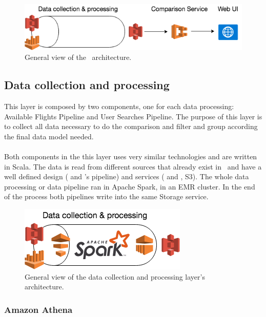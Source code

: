 \begin{figure}[H]
\centering
\includegraphics[scale=0.7]{diagrams/architecture01.png}
\caption{General view of the \thesis\ architecture.}
\end{figure}


\subsection{Data collection and processing} \label{data_layer}

This layer is composed by two components, one for each data processing: Available Flights Pipeline and User Searches Pipeline. The purpose of this layer is to collect all data necessary to do the comparison and filter and group according the final data model needed.
\\\\
Both components in the this layer uses very similar technologies and are written in Scala\cite{scala}. The data is read from different sources that already exist in \company\ and have a well defined design ( and \squad's pipeline) and services ( and , S3). The whole data processing or data pipeline ran in Apache Spark, in an EMR cluster. In the end of the process both pipelines write into the same Storage service.

\begin{figure}[H]
\centering
\includegraphics[scale=0.7]{diagrams/architecture-data.png}
\caption{General view of the data collection and processing layer's architecture.}
\end{figure}

\subsubsection*{Amazon Athena} \label{athena}


